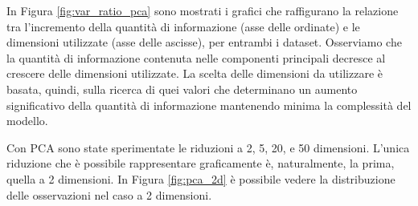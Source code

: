 \documentclass[12pt,italian]{report}
\begin{document}
In Figura \ref{fig:var_ratio_pca} sono mostrati i grafici che raffigurano la relazione tra l'incremento della quantità di informazione (asse delle ordinate) e le dimensioni utilizzate (asse delle ascisse), per entrambi i dataset. Osserviamo che la quantità di informazione contenuta nelle componenti principali decresce al crescere delle dimensioni utilizzate. La scelta delle dimensioni da utilizzare è basata, quindi, sulla ricerca di quei valori che determinano un aumento significativo della quantità di informazione mantenendo minima la complessità del modello.


Con PCA sono state sperimentate le riduzioni a 2, 5, 20, e 50 dimensioni. L'unica riduzione che è possibile rappresentare graficamente è, naturalmente, la prima, quella a 2 dimensioni. In Figura \ref{fig:pca_2d} è possibile vedere la distribuzione delle osservazioni nel caso a 2 dimensioni.
\end{document}
